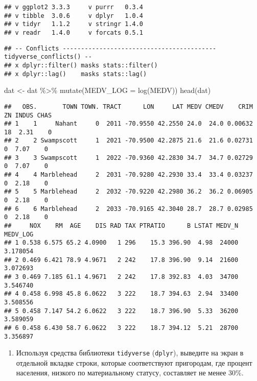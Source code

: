 \documentclass[
]{article}
\newenvironment{Shaded}{\begin{snugshade}}{\end{snugshade}}
\newcommand{\AttributeTok}[1]{\textcolor[rgb]{0.77,0.63,0.00}{#1}}
\newcommand{\FunctionTok}[1]{\textcolor[rgb]{0.00,0.00,0.00}{#1}}
\newcommand{\NormalTok}[1]{#1}
\newcommand{\OtherTok}[1]{\textcolor[rgb]{0.56,0.35,0.01}{#1}}
\newcommand{\SpecialCharTok}[1]{\textcolor[rgb]{0.00,0.00,0.00}{#1}}
\providecommand{\tightlist}{%
  \setlength{\itemsep}{0pt}\setlength{\parskip}{0pt}}
\begin{document}
\begin{verbatim}
## v ggplot2 3.3.3     v purrr   0.3.4
## v tibble  3.0.6     v dplyr   1.0.4
## v tidyr   1.1.2     v stringr 1.4.0
## v readr   1.4.0     v forcats 0.5.1
\end{verbatim}

\begin{verbatim}
## -- Conflicts ------------------------------------------ tidyverse_conflicts() --
## x dplyr::filter() masks stats::filter()
## x dplyr::lag()    masks stats::lag()
\end{verbatim}

\begin{Shaded}
\begin{Highlighting}[]
\NormalTok{dat }\OtherTok{\textless{}{-}}\NormalTok{ dat }\SpecialCharTok{\%\textgreater{}\%} \FunctionTok{mutate}\NormalTok{(}\AttributeTok{MEDV\_LOG =} \FunctionTok{log}\NormalTok{(MEDV))}
\FunctionTok{head}\NormalTok{(dat)}
\end{Highlighting}
\end{Shaded}

\begin{verbatim}
##   OBS.       TOWN TOWN. TRACT      LON     LAT MEDV CMEDV    CRIM ZN INDUS CHAS
## 1    1     Nahant     0  2011 -70.9550 42.2550 24.0  24.0 0.00632 18  2.31    0
## 2    2 Swampscott     1  2021 -70.9500 42.2875 21.6  21.6 0.02731  0  7.07    0
## 3    3 Swampscott     1  2022 -70.9360 42.2830 34.7  34.7 0.02729  0  7.07    0
## 4    4 Marblehead     2  2031 -70.9280 42.2930 33.4  33.4 0.03237  0  2.18    0
## 5    5 Marblehead     2  2032 -70.9220 42.2980 36.2  36.2 0.06905  0  2.18    0
## 6    6 Marblehead     2  2033 -70.9165 42.3040 28.7  28.7 0.02985  0  2.18    0
##     NOX    RM  AGE    DIS RAD TAX PTRATIO      B LSTAT MEDV_N MEDV_LOG
## 1 0.538 6.575 65.2 4.0900   1 296    15.3 396.90  4.98  24000 3.178054
## 2 0.469 6.421 78.9 4.9671   2 242    17.8 396.90  9.14  21600 3.072693
## 3 0.469 7.185 61.1 4.9671   2 242    17.8 392.83  4.03  34700 3.546740
## 4 0.458 6.998 45.8 6.0622   3 222    18.7 394.63  2.94  33400 3.508556
## 5 0.458 7.147 54.2 6.0622   3 222    18.7 396.90  5.33  36200 3.589059
## 6 0.458 6.430 58.7 6.0622   3 222    18.7 394.12  5.21  28700 3.356897
\end{verbatim}

\begin{enumerate}
\def\labelenumi{\arabic{enumi}.}
\setcounter{enumi}{6}
\tightlist
\item
  Используя средства библиотеки \texttt{tidyverse} (\texttt{dplyr}),
  выведите на экран в отдельной вкладке строки, которые соответствуют
  пригородам, где процент населения, низкого по материальному статусу,
  составляет не менее 30\%.
\end{enumerate}
\end{document}
